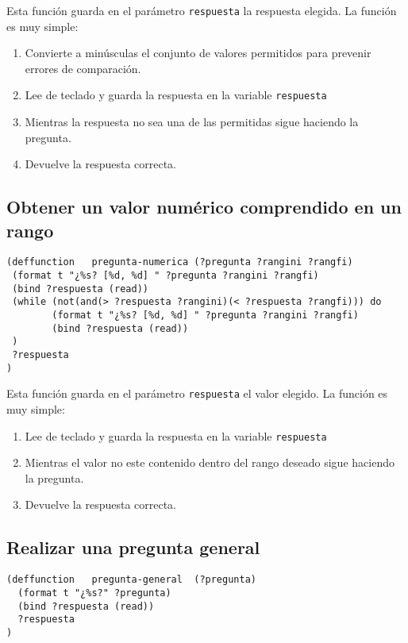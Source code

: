 \documentclass[11pt,svgnames]{scrbook}
\begin{document}
Esta función guarda en el parámetro \texttt{respuesta} la respuesta elegida. La función es muy simple:
\begin{enumerate}
\item Convierte a minúsculas el conjunto de valores permitidos para prevenir errores de comparación.
\item Lee de teclado y guarda la respuesta en la variable \texttt{respuesta}
\item Mientras la respuesta no sea una de las permitidas sigue haciendo la pregunta.
\item Devuelve la respuesta correcta.
\end{enumerate}


\subsection{Obtener un valor numérico comprendido en un rango}

\begin{verbatim}
(deffunction   pregunta-numerica (?pregunta ?rangini ?rangfi)
 (format t "¿%s? [%d, %d] " ?pregunta ?rangini ?rangfi)
 (bind ?respuesta (read))
 (while (not(and(> ?respuesta ?rangini)(< ?respuesta ?rangfi))) do
        (format t "¿%s? [%d, %d] " ?pregunta ?rangini ?rangfi)
        (bind ?respuesta (read))
 )
 ?respuesta
) \end{verbatim}

Esta función guarda en el parámetro \texttt{respuesta} el valor elegido. La función es muy simple:

\begin{enumerate}
 \item Lee de teclado y guarda la respuesta en la variable \texttt{respuesta}
\item Mientras el valor no este contenido dentro del rango deseado sigue haciendo la pregunta.
\item Devuelve la respuesta correcta.
\end{enumerate}


\subsection{Realizar una pregunta general}


\begin{verbatim}
(deffunction   pregunta-general  (?pregunta)
  (format t "¿%s?" ?pregunta)
  (bind ?respuesta (read))
  ?respuesta
)\end{verbatim}
\end{document}
